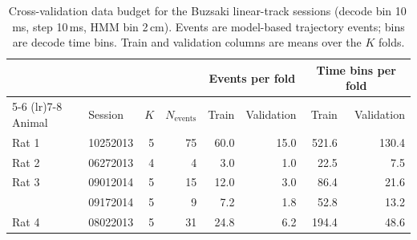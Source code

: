 \begin{table}[htbp]
  \centering
  \begin{tabular}{llrrrrrr}
    \toprule
    & & & & \multicolumn{2}{c}{Events per fold} & \multicolumn{2}{c}{Time bins per fold} \\
    \cmidrule(lr){5-6} \cmidrule(lr){7-8}
    Animal & Session & $K$ & $N_{\mathrm{events}}$ & Train & Validation & Train & Validation \\
    \midrule
    Rat 1 & 10252013 & 5 & 75 & 60.0 & 15.0 & 521.6 & 130.4 \\
    \addlinespace
    Rat 2 & 06272013 & 4 & 4 & 3.0 & 1.0 & 22.5 & 7.5 \\
    \addlinespace
    Rat 3 & 09012014 & 5 & 15 & 12.0 & 3.0 & 86.4 & 21.6 \\
     & 09172014 & 5 & 9 & 7.2 & 1.8 & 52.8 & 13.2 \\
    \addlinespace
    Rat 4 & 08022013 & 5 & 31 & 24.8 & 6.2 & 194.4 & 48.6 \\
    \bottomrule
  \end{tabular}
  \caption{Cross-validation data budget for the Buzsaki linear-track sessions (decode bin 10\,ms, step 10\,ms, HMM bin 2\,cm). Events are model-based trajectory events; bins are decode time bins. Train and validation columns are means over the $K$ folds.}
  \label{tab:cv-budget-buzsaki}
\end{table}
